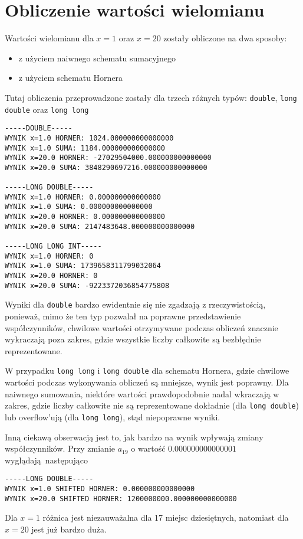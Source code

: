 \documentclass{article}
\begin{document}
\section{Obliczenie wartości wielomianu}
Wartości wielomianu dla $x=1$ oraz $x=20$ zostały obliczone na dwa sposoby:
\begin{itemize}
    \item
    z użyciem naiwnego schematu sumacyjnego
    \item
    z użyciem schematu Hornera
\end{itemize}
Tutaj obliczenia przeprowadzone zostały dla trzech różnych typów:
\verb|double|, \verb|long double| oraz \verb|long long|
\begin{verbatim}
-----DOUBLE-----
WYNIK x=1.0 HORNER: 1024.000000000000000
WYNIK x=1.0 SUMA: 1184.000000000000000
WYNIK x=20.0 HORNER: -27029504000.000000000000000
WYNIK x=20.0 SUMA: 3848290697216.000000000000000

-----LONG DOUBLE-----
WYNIK x=1.0 HORNER: 0.000000000000000
WYNIK x=1.0 SUMA: 0.000000000000000
WYNIK x=20.0 HORNER: 0.000000000000000
WYNIK x=20.0 SUMA: 2147483648.000000000000000

-----LONG LONG INT-----
WYNIK x=1.0 HORNER: 0
WYNIK x=1.0 SUMA: 1739658311799032064
WYNIK x=20.0 HORNER: 0
WYNIK x=20.0 SUMA: -9223372036854775808
\end{verbatim}

Wyniki dla \verb|double| bardzo ewidentnie się nie zgadzają z rzeczywistością, ponieważ, mimo że ten typ
pozwalał na poprawne przedstawienie współczynników, chwilowe wartości otrzymywane podczas
obliczeń znacznie wykraczają poza zakres, gdzie wszystkie liczby całkowite są bezbłędnie reprezentowane.

W przypadku \verb|long long| i \verb|long double| dla schematu Hornera, gdzie chwilowe wartości
podczas wykonywania obliczeń są mniejsze, wynik jest poprawny. Dla naiwnego sumowania, niektóre wartości
prawdopodobnie nadal wkraczają w zakres, gdzie liczby całkowite nie są reprezentowane dokładnie (dla \verb|long double|)
lub overflow'ują (dla \verb|long long|), stąd niepoprawne wyniki.

Inną ciekawą obserwacją jest to, jak bardzo na wynik wpływają zmiany współczynników. Przy zmianie $a_{19}$ o wartość $0.000000000000001$
wyglądają następująco
\begin{verbatim}
-----LONG DOUBLE-----
WYNIK x=1.0 SHIFTED HORNER: 0.000000000000000
WYNIK x=20.0 SHIFTED HORNER: 1200000000.000000000000000
\end{verbatim}
Dla $x=1$ różnica jest niezauważalna dla 17 miejsc dziesiętnych, natomiast dla $x=20$ jest już bardzo duża.
\end{document}
